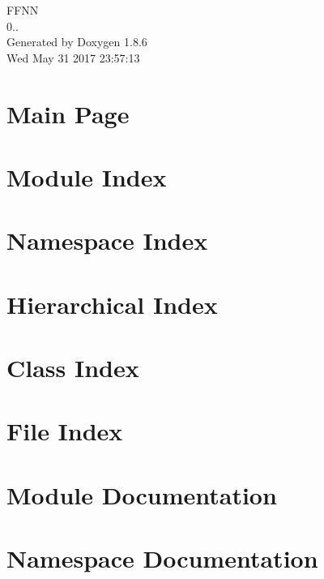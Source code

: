 \documentclass[twoside]{book}
\newcommand{\clearemptydoublepage}{%
  \newpage{\pagestyle{empty}\cleardoublepage}%
}
\begin{document}
\hypersetup{pageanchor=false}
\begin{titlepage}
\vspace*{7cm}
\begin{center}%
{\Large F\-F\-N\-N \\[1ex]\large 0.. }\\
\vspace*{1cm}
{\large Generated by Doxygen 1.8.6}\\
\vspace*{0.5cm}
{\small Wed May 31 2017 23:57:13}\\
\end{center}
\end{titlepage}
\clearemptydoublepage
\tableofcontents
\clearemptydoublepage
{}
\hypersetup{pageanchor=true}

\chapter{Main Page}
\label{index}\hypertarget{index}{}
\chapter{Module Index}

\chapter{Namespace Index}

\chapter{Hierarchical Index}

\chapter{Class Index}

\chapter{File Index}

\chapter{Module Documentation}

\chapter{Namespace Documentation}














\end{document}
